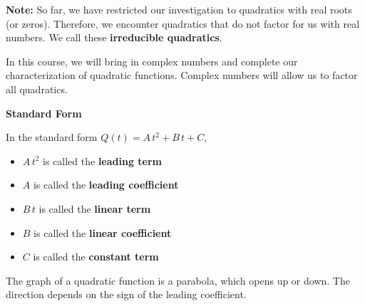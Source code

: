 \documentclass{ximera}
\begin{document}
\textbf{Note:} So far, we have restricted our investigation to quadratics with real roots (or zeros).  Therefore, we encounter quadratics that do not factor for us with real numbers. We call these \textbf{irreducible quadratics}.  



In this course, we will bring in complex numbers and complete our characterization of quadratic functions. Complex numbers will allow us to factor all quadratics.




\begin{notation} \textbf{\textcolor{red!50!green}{Standard Form}} 

In the standard form $Q(t) = A \, t^2 + B \, t + C  $,


\begin{itemize}
\item $A \, t^2$ is called the \textbf{leading term}
\item $A$ is called the \textbf{leading coefficient}
\item $B \, t$ is called the \textbf{linear term}
\item $B$ is called the \textbf{linear coefficient}
\item $C$ is called the \textbf{constant term}
\end{itemize}





\end{notation}







The graph of a quadratic function is a parabola, which opens up or down.  The direction depends on the sign of the leading coefficient.
\end{document}
